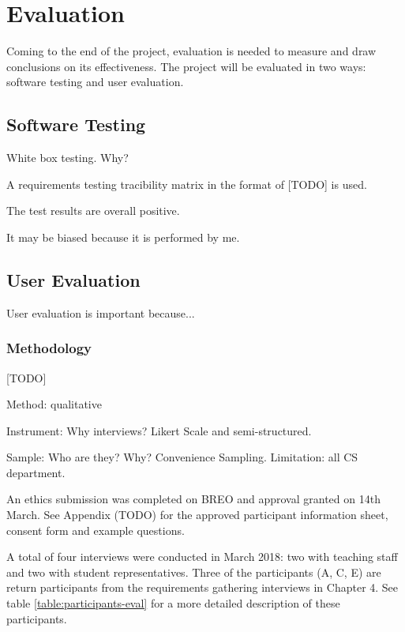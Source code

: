 \chapter{Evaluation}

Coming to the end of the project, evaluation is needed to measure and draw conclusions 
on its effectiveness. The project will be evaluated in two ways: 
software testing and user evaluation.

\section{Software Testing}

White box testing. Why?

A requirements testing tracibility matrix in the format of [TODO] is used.

The test results are overall positive.

It may be biased because it is performed by me.

\section{User Evaluation}

User evaluation is important because...

\subsection{Methodology}
[TODO]

Method: qualitative

Instrument: Why interviews? Likert Scale and semi-structured.

Sample: Who are they? Why? Convenience Sampling. Limitation: all CS department.

An ethics submission was completed on BREO and approval granted on 14th March. 
See Appendix (TODO) for the approved participant information sheet, consent form and example questions.

A total of four interviews were conducted in March 2018: 
two with teaching staff and two with student representatives. 
Three of the participants (A, C, E) are return participants from the requirements gathering interviews in Chapter 4.
See table \ref{table:participants-eval} for a more detailed description of these participants.

